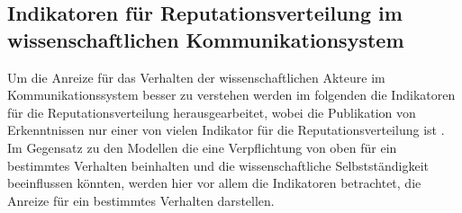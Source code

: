 \subsection{Indikatoren für Reputationsverteilung im wissenschaftlichen Kommunikationsystem}

Um die Anreize für das Verhalten der wissenschaftlichen Akteure im Kommunikationssystem besser zu verstehen werden im folgenden die Indikatoren für die Reputationsverteilung herausgearbeitet, wobei die Publikation von Erkenntnissen nur einer von vielen Indikator für die Reputationsverteilung ist \cite{hirschauer2004peer}. Im Gegensatz zu den Modellen die eine Verpflichtung von oben für ein bestimmtes Verhalten beinhalten und die wissenschaftliche Selbstständigkeit beeinflussen könnten, werden hier vor allem die Indikatoren betrachtet, die Anreize für ein bestimmtes Verhalten darstellen.

